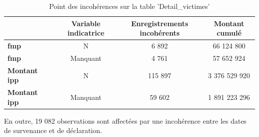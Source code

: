 \begin{table}[H]
\caption{Point des incoh\'erences sur la table 'Detail\_victimes'}
{\footnotesize
\begin{center}
    
\begin{tabular}{llccc}
\toprule 
&& \textbf{Variable indicatrice} & \textbf{Enregistrements incoh\'erents} & \textbf{Montant cumul\'e}  \\
\midrule
\textbf{\acrshort{fmp}} && N & 6 892 & 66 124 800 \\ 
\textbf{\acrshort{fmp}} && Manquant & 4 761 & 57 652 924\\ 
\textbf{Montant \acrshort{ipp}} && N & 115 897 & 3 376 529 920 \\
\textbf{Montant \acrshort{ipp}} && Manquant & 59 602 & 1 891 223 296  \\
\bottomrule
\end{tabular}
\end{center}
}
\end{table}
En outre, 19 082 observations sont affect\'ees par une incoh\'erence entre les dates de survenance et de d\'eclaration.
\newpage